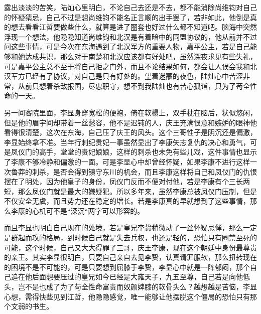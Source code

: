 露出淡淡的苦笑，陆灿心里明白，不论自己去还是不去，都不能消除尚维钧对自己的怀疑猜忌，自己不过是想尚维钧不能名正言顺的出手罢了，若非如此，他倒是真的想去看看江哲要做些什么，就算是进了圈套也好过什么都不知道吧。脑海中突然浮现一个想法，他隐隐知道尚维钧和北汉是有着暗中的同盟协议的，他从前并不过问这些事情，可是今次在东海遇到了北汉军方的重要人物，嘉平公主，若是自己能够和她达成共识，那么对于南楚和北汉应该都有好处吧，虽然深夜求见有些失礼，可是嘉平公主总不至于将自己拒之门外，而且不论结果如何，都会让人误会我和北汉军方已经有了协议，对自己是只有好处的。望着迷蒙的夜色，陆灿心中苦涩非常，从前只想着杀敌报国，尽忠职守，想不到我陆灿也有苦心孤诣，只为了苟全性命的一天。

另一间客院里面，李显身穿宽松的便袍，倚在软榻上，双手枕在脑后，状似悠闲，但是他的眉宇间却带着一丝愁容，他不是迟钝的人，庆王充满恨意和嫉妒的眼神他看得很清楚，这次在东海，自己压了庆王的风头。这个三哥性子是阴沉还是偏激，李显始终拿不准。当年行刺纪贵妃一事虽然显出了李康矢志复仇的决心和勇气，可是凤仪门的高手，堂堂的贵妃娘娘，这样的刺杀也未免有些儿戏，这件事情也显示了李康不够冷静和偏激的一面。可是李显心中却曾经怀疑，如果李康不进行这样一次鲁莽的刺杀，是否会得到镇守东川的机会，而且李康这样将自己和凤仪门的仇恨摆在了明处，因为他皇子的身份，凤仪门反而不便对付他，若是李康有个三长两短，那么凤仪门就是最大的嫌疑犯。所以多年来，虽然李康总被凤仪门压制，但是不仅安全无虞，而且势力还在稳定的增长。若是李康真的早就想到了这些事情，那么李康的心机可不是“深沉“两字可以形容的。

而且李显也明白自己现在的处境，若是皇兄李贽稍微动了一丝怀疑忌惮，那么一定是群起而攻的格局，到时候自己就是失去兵权，也还是轻的，恐怕只有圈禁至死的可能，这个时候，自己又大大得罪了三哥，庆王李康，现在这个朝廷中身份最尊贵的亲王。其实李显很明白，只要自己亲自去见李贽，认真请罪服软，那么扭转现在的困境不是不可能的，可是只要想到屈膝于李贽，李显心中就是一阵郁闷，那个自己追在他后面想要压过的皇兄如今已经是大雍天子，九五至尊，自己若是向他低头，岂不是也成了为了苟全性命富贵而奴颜婢膝的软骨头么？越想越是苦恼，李显心想，需得快些见到江哲，他隐隐感觉，唯一能够让他摆脱这个僵局的恐怕只有那个文弱的书生。


